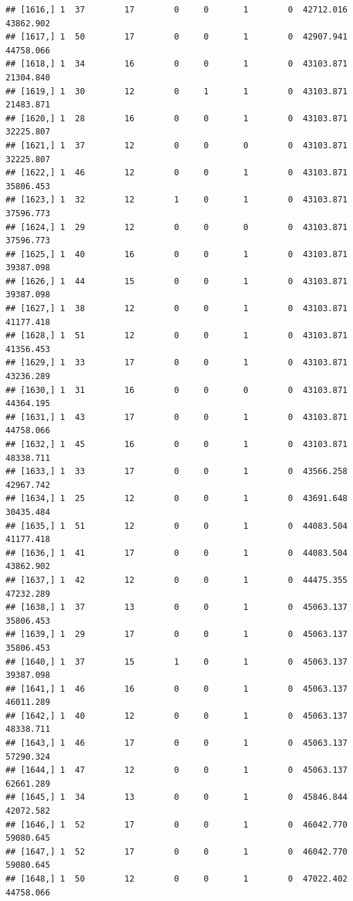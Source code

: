 \documentclass[
]{article}
\begin{document}
\begin{verbatim}
## [1616,] 1  37        17        0     0       1        0  42712.016  43862.902
## [1617,] 1  50        17        0     0       1        0  42907.941  44758.066
## [1618,] 1  34        16        0     0       1        0  43103.871  21304.840
## [1619,] 1  30        12        0     1       1        0  43103.871  21483.871
## [1620,] 1  28        16        0     0       1        0  43103.871  32225.807
## [1621,] 1  37        12        0     0       0        0  43103.871  32225.807
## [1622,] 1  46        12        0     0       1        0  43103.871  35806.453
## [1623,] 1  32        12        1     0       1        0  43103.871  37596.773
## [1624,] 1  29        12        0     0       0        0  43103.871  37596.773
## [1625,] 1  40        16        0     0       1        0  43103.871  39387.098
## [1626,] 1  44        15        0     0       1        0  43103.871  39387.098
## [1627,] 1  38        12        0     0       1        0  43103.871  41177.418
## [1628,] 1  51        12        0     0       1        0  43103.871  41356.453
## [1629,] 1  33        17        0     0       1        0  43103.871  43236.289
## [1630,] 1  31        16        0     0       0        0  43103.871  44364.195
## [1631,] 1  43        17        0     0       1        0  43103.871  44758.066
## [1632,] 1  45        16        0     0       1        0  43103.871  48338.711
## [1633,] 1  33        17        0     0       1        0  43566.258  42967.742
## [1634,] 1  25        12        0     0       1        0  43691.648  30435.484
## [1635,] 1  51        12        0     0       1        0  44083.504  41177.418
## [1636,] 1  41        17        0     0       1        0  44083.504  43862.902
## [1637,] 1  42        12        0     0       1        0  44475.355  47232.289
## [1638,] 1  37        13        0     0       1        0  45063.137  35806.453
## [1639,] 1  29        17        0     0       1        0  45063.137  35806.453
## [1640,] 1  37        15        1     0       1        0  45063.137  39387.098
## [1641,] 1  46        16        0     0       1        0  45063.137  46011.289
## [1642,] 1  40        12        0     0       1        0  45063.137  48338.711
## [1643,] 1  46        17        0     0       1        0  45063.137  57290.324
## [1644,] 1  47        12        0     0       1        0  45063.137  62661.289
## [1645,] 1  34        13        0     0       1        0  45846.844  42072.582
## [1646,] 1  52        17        0     0       1        0  46042.770  59080.645
## [1647,] 1  52        17        0     0       1        0  46042.770  59080.645
## [1648,] 1  50        12        0     0       1        0  47022.402  44758.066

\end{verbatim}
\end{document}
